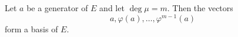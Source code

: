 Let $a$ be a generator of $E$ and let $\deg \mu = m$. Then the vectors
$$a, \varphi(a), \ldots, \varphi^{m-1}(a)$$
form a basis of $E$.
